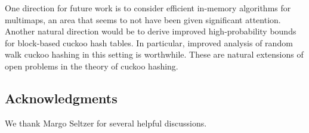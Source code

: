 \documentclass[11pt,letterpaper]{article}
\newcommand{\eat}[1]{}
\begin{document}
One direction for future work is to consider efficient in-memory
algorithms for multimaps, an area that seems to not have been given
significant attention.  Another natural direction 
would be to derive improved high-probability bounds for block-based
cuckoo hash tables.  In particular, improved analysis of random walk
cuckoo hashing in this setting is worthwhile.  These are natural
extensions of open problems in the theory of cuckoo hashing.

\eat{
It is also worth noting that using cuckoo hash tables we can, in
theory, trade off constant factors in space against the time to
perform operations in fairly well-understood ways.  Our multiqueue
description is not currently optimized for space.  It would be
worthwhile to attempt to understand the tradeoffs for this
structure, in order to attempt to minimize the amount of unused space
(not residing in blocks in the free list) at any point.
}

\subsection*{Acknowledgments}
We thank Margo Seltzer for several helpful discussions.


{\raggedright


}
\end{document}
